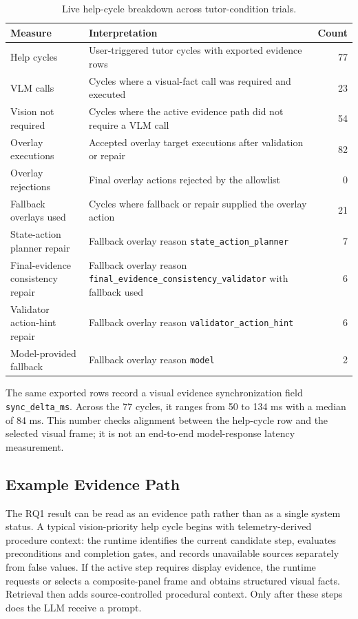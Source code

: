 \begin{table}[htbp]
\centering
\caption{Live help-cycle breakdown across tutor-condition trials.}
\label{tab:rq1-help-cycle-breakdown}
\small
\begin{tabularx}{\textwidth}{@{}lXr@{}}
\toprule
\textbf{Measure} & \textbf{Interpretation} & \textbf{Count} \\
\midrule
Help cycles & User-triggered tutor cycles with exported evidence rows & 77 \\
VLM calls & Cycles where a visual-fact call was required and executed & 23 \\
Vision not required & Cycles where the active evidence path did not require a VLM call & 54 \\
Overlay executions & Accepted overlay target executions after validation or repair & 82 \\
Overlay rejections & Final overlay actions rejected by the allowlist & 0 \\
Fallback overlays used & Cycles where fallback or repair supplied the overlay action & 21 \\
State-action planner repair & Fallback overlay reason \texttt{state\_action\_planner} & 7 \\
Final-evidence consistency repair & Fallback overlay reason \texttt{final\_evidence\_consistency\_validator} with fallback used & 6 \\
Validator action-hint repair & Fallback overlay reason \texttt{validator\_action\_hint} & 6 \\
Model-provided fallback & Fallback overlay reason \texttt{model} & 2 \\
\bottomrule
\end{tabularx}
\end{table}

The same exported rows record a visual evidence synchronization field
\texttt{sync\_delta\_ms}. Across the 77 cycles, it ranges from 50 to 134 ms
with a median of 84 ms. This number checks alignment between the help-cycle row
and the selected visual frame; it is not an end-to-end model-response latency
measurement.

\subsection{Example Evidence Path}

The RQ1 result can be read as an evidence path rather than as a single system
status. A typical vision-priority help cycle begins with telemetry-derived
procedure context: the runtime identifies the current candidate step, evaluates
preconditions and completion gates, and records unavailable sources separately
from false values. If the active step requires display evidence, the runtime
requests or selects a composite-panel frame and obtains structured visual facts.
Retrieval then adds source-controlled procedural context. Only after these
steps does the LLM receive a prompt.


